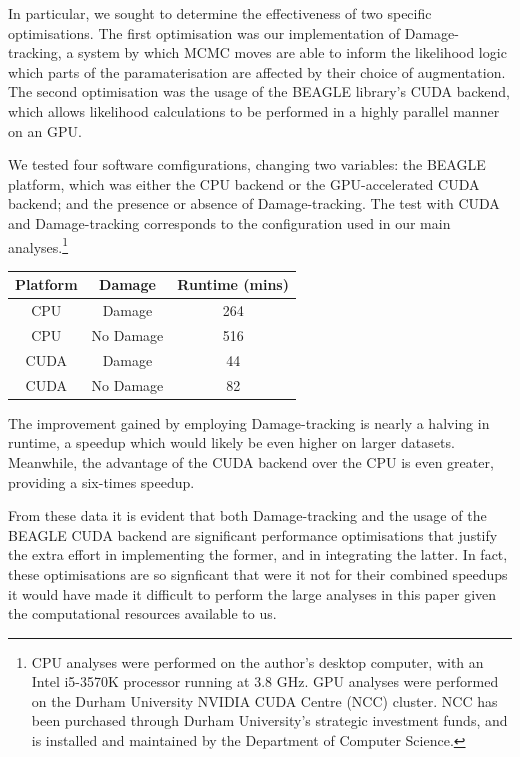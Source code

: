 \documentclass[10pt,journal,compsoc]{IEEEtran}
\begin{document}
In particular, we sought to determine the effectiveness of two specific optimisations. The first optimisation was our implementation of Damage-tracking, a system by which MCMC moves are able to inform the likelihood logic which parts of the paramaterisation are affected by their choice of augmentation. The second optimisation was the usage of the BEAGLE library's CUDA backend, which allows likelihood calculations to be performed in a highly parallel manner on an GPU.

We tested four software comfigurations, changing two variables: the BEAGLE platform, which was either the CPU backend or the GPU-accelerated CUDA backend; and the presence or absence of Damage-tracking. The test with CUDA and Damage-tracking corresponds to the configuration used in our main analyses.\footnote{CPU analyses were performed on the author's desktop computer, with an Intel i5-3570K processor running at 3.8 GHz. GPU analyses were performed on the Durham University NVIDIA CUDA Centre (NCC) cluster. NCC has been purchased through Durham University's strategic investment funds, and is installed and maintained by the Department of Computer Science.}

\begin{center}

\begin{tabular}{ |c|c|c| }
    \hline
    Platform & Damage & Runtime (mins) \\
    \hline
    CPU& Damage & 264 \\
    CPU& No Damage & 516 \\
    CUDA& Damage & 44 \\
    CUDA& No Damage & 82 \\
    \hline
\end{tabular}

\end{center}

The improvement gained by employing Damage-tracking is nearly a halving in runtime, a speedup which would likely be even higher on larger datasets. Meanwhile, the advantage of the CUDA backend over the CPU is even greater, providing a six-times speedup.

From these data it is evident that both Damage-tracking and the usage of the BEAGLE CUDA backend are significant performance optimisations that justify the extra effort in implementing the former, and in integrating the latter. In fact, these optimisations are so signficant that were it not for their combined speedups it would have made it difficult to perform the large analyses in this paper given the computational resources available to us.
\end{document}
